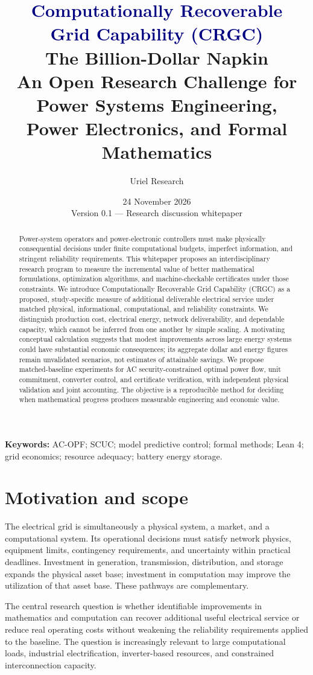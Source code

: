 \documentclass[11pt,letterpaper]{article}
\title{\textcolor{navy}{\bfseries Computationally Recoverable\\Grid Capability (CRGC)}\\[0.5em]
\large The Billion-Dollar Napkin\\[0.2em]
\normalsize An Open Research Challenge for Power Systems Engineering,\\ Power Electronics, and Formal Mathematics}
\author{Uriel Research}
\date{24 November 2026 \\ \small Version 0.1 --- Research discussion whitepaper}
\begin{document}
\maketitle
\begin{abstract}
Power-system operators and power-electronic controllers must make physically consequential decisions under finite computational budgets, imperfect information, and stringent reliability requirements. This whitepaper proposes an interdisciplinary research program to measure the incremental value of better mathematical formulations, optimization algorithms, and machine-checkable certificates under those constraints. We introduce Computationally Recoverable Grid Capability (CRGC) as a proposed, study-specific measure of additional deliverable electrical service under matched physical, informational, computational, and reliability constraints. We distinguish production cost, electrical energy, network deliverability, and dependable capacity, which cannot be inferred from one another by simple scaling. A motivating conceptual calculation suggests that modest improvements across large energy systems could have substantial economic consequences; its aggregate dollar and energy figures remain unvalidated scenarios, not estimates of attainable savings. We propose matched-baseline experiments for AC security-constrained optimal power flow, unit commitment, converter control, and certificate verification, with independent physical validation and joint accounting. The objective is a reproducible method for deciding when mathematical progress produces measurable engineering and economic value.
\end{abstract}

\textbf{Keywords:} AC-OPF; SCUC; model predictive control; formal methods; Lean 4; grid economics; resource adequacy; battery energy storage.

\section{Motivation and scope}
The electrical grid is simultaneously a physical system, a market, and a computational system. Its operational decisions must satisfy network physics, equipment limits, contingency requirements, and uncertainty within practical deadlines. Investment in generation, transmission, distribution, and storage expands the physical asset base; investment in computation may improve the utilization of that asset base. These pathways are complementary.

The central research question is whether identifiable improvements in mathematics and computation can recover additional useful electrical service or reduce real operating costs without weakening the reliability requirements applied to the baseline. The question is increasingly relevant to large computational loads, industrial electrification, inverter-based resources, and constrained interconnection capacity.
\end{document}
